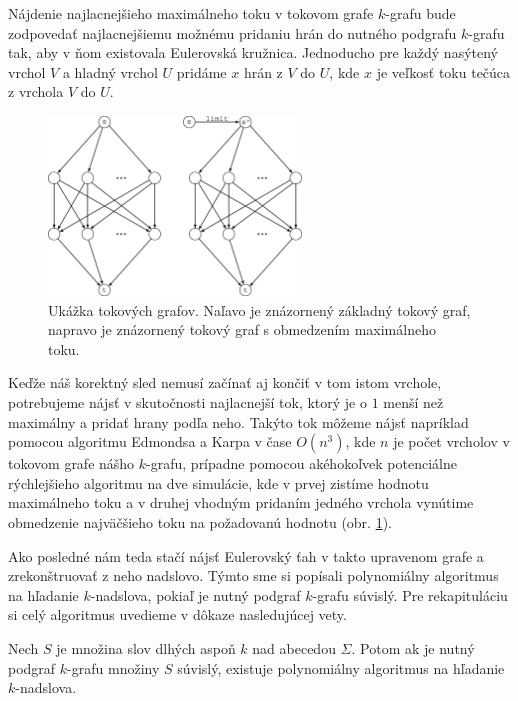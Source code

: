 Nájdenie najlacnejšieho maximálneho toku v tokovom grafe $k$-grafu bude zodpovedať
najlacnejšiemu možnému pridaniu hrán do nutného podgrafu $k$-grafu tak, aby v ňom existovala Eulerovská
kružnica. Jednoducho pre každý nasýtený vrchol $V$ a hladný vrchol $U$ pridáme $x$ hrán z $V$ do $U$,
kde $x$ je veľkosť toku tečúca z vrchola $V$ do $U$.

\begin{figure}

\centerline{\includegraphics[width=0.6\textwidth]{images/toky-2.pdf}}

\caption[Ukážka tokových grafov]{Ukážka tokových grafov. Naľavo je znázornený základný tokový graf, napravo je znázornený
tokový graf s obmedzením maximálneho toku.}

\label{obr:toky}

\end{figure}


Keďže náš korektný sled nemusí začínať aj končiť v tom istom vrchole, potrebujeme
nájsť v skutočnosti najlacnejší tok, ktorý je o $1$ menší než maximálny a pridať hrany podľa neho.
Takýto tok môžeme nájsť napríklad pomocou algoritmu Edmondsa a Karpa \cite{mincost_maxflow} v
čase $O(n^3)$, kde $n$ je počet vrcholov v tokovom grafe nášho $k$-grafu, prípadne pomocou akéhokoľvek potenciálne rýchlejšieho
algoritmu na dve simulácie, kde v prvej zistíme hodnotu maximálneho toku a v druhej vhodným pridaním jedného vrchola vynútime
obmedzenie najväčšieho toku na požadovanú hodnotu (obr. \ref{obr:toky}).

Ako posledné nám teda stačí nájsť Eulerovský ťah v takto upravenom grafe a zrekonštruovať z neho
nadslovo. Týmto sme si popísali polynomiálny algoritmus na hľadanie $k$-nadslova, pokiaľ je
nutný podgraf $k$-grafu súvislý. Pre rekapituláciu si celý algoritmus uvedieme v dôkaze nasledujúcej
vety.

\begin{veta}
    Nech $S$ je množina slov dlhých aspoň $k$ nad abecedou $\Sigma$. Potom ak je nutný podgraf $k$-grafu množiny $S$
    súvislý, existuje polynomiálny algoritmus na hľadanie $k$-nadslova.
\end{veta}

